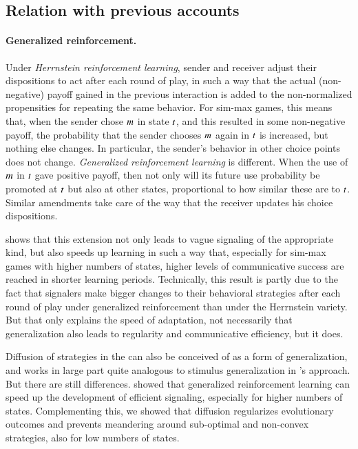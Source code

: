 \documentclass[fleqn,reqno,10pt]{article}
\newcommand{\rdd}{\acro{rdd}} %
\begin{document}
\subsection{Relation with previous accounts}
\label{sec:relat-with-prev}

\paragraph{Generalized reinforcement.}

Under \emph{Herrnstein reinforcement learning}, sender and receiver
adjust their dispositions to act after each round of play, in such a
way that the actual (non-negative) payoff gained in the previous
interaction is added to the non-normalized propensities for repeating
the same behavior. For sim-max games, this means that, when the sender
chose $m$ in state $t$, and this resulted in some
non-negative payoff, the probability that the sender chooses $m$
again in $t$ is increased, but nothing else changes. In
particular, the sender's behavior in other choice points does not
change. \emph{Generalized reinforcement learning} is different. When
the use of $m$ in $t$ gave positive payoff, then not only
will its future use probability be promoted at $t$ but also at
other states, proportional to how similar these are to
$t$. Similar amendments take care of the way that the receiver
updates his choice dispositions.

\citet{OConnor2013:The-Evolution-o} shows that this extension not only
leads to vague signaling of the appropriate kind, but also speeds up
learning in such a way that, especially for sim-max games with higher
numbers of states, higher levels of communicative success are reached
in shorter learning periods. Technically, this result is partly due to
the fact that signalers make bigger changes to their behavioral
strategies after each round of play under generalized reinforcement
than under the Herrnstein variety. But that only explains the speed of
adaptation, not necessarily that generalization also leads to
regularity and communicative efficiency, but it does.

Diffusion of strategies in the \rdd can also be conceived of as a form
of generalization, and works in large part quite analogous to stimulus
generalization in \citeauthor{OConnor2013:The-Evolution-o}'s
approach. But there are still
differences. \citeauthor{OConnor2013:The-Evolution-o} showed that
generalized reinforcement learning can speed up the development of
efficient signaling, especially for higher numbers of
states. Complementing this, we showed that diffusion regularizes
evolutionary outcomes and prevents meandering around sub-optimal and
non-convex strategies, also for low numbers of states.
\end{document}
